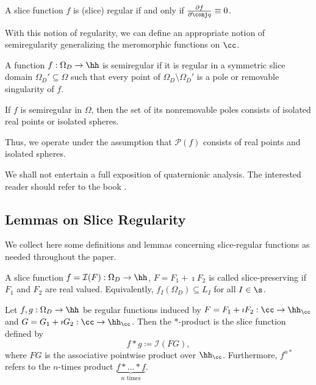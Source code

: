 \documentclass{amsart}
\begin{document}
\begin{remark}
    A slice function $f$ is (slice) regular if and only if $\frac{\partial f}{\partial \conj q}\equiv 0$. 
\end{remark}

With this notion of regularity, we can define an appropriate notion of semiregularity generalizing the meromorphic functions on $\cc$. 

\begin{defin}
    A function $f:\Omega_D\to\hh$ is semiregular if it is regular in a symmetric slice domain $\Omega_D' \subseteq \Omega$ such that every point of $\Omega_D\setminus \Omega_D'$ is a pole or removable singularity of $f$. 
\end{defin}
\begin{remark}
    If $f$ is semiregular in $\Omega$, then the set of its nonremovable poles consists of isolated real points or isolated spheres. 
\end{remark}
Thus, we operate under the assumption that $\mathcal{P}(f)$ consists of real points and isolated spheres. 

We shall not entertain a full exposition of quaternionic analysis. The interested reader should refer to the book \cite{gentili2022}. 

\subsection{Lemmas on Slice Regularity}

We collect here some definitions and lemmas concerning slice-regular functions as needed throughout the paper.

\begin{defin}
    A slice function $f=\mathcal{I}(F):\Omega_D\to\hh$, $F=F_1+\imath F_2$ is called slice-preserving if $F_1$ and $F_2$ are real valued. Equivalently, $f_I(\Omega_D)\subseteq L_I$ for all $I\in\s$.  
\end{defin}

\begin{defin}
    Let $f,g:\Omega_D\to\hh$ be regular functions induced by $F=F_1+\imath F_2:\cc \to\hh_\cc$ and $G=G_1+\imath G_2:\cc \to\hh_\cc$. Then the $*$-product is the slice function defined by \[f*g\coloneq \mathcal{I}(FG),\] where $FG$ is the associative pointwise product over $\hh_\cc$. Furthermore, $f^{n*}$ refers to the $n$-times product $\underbrace{f*\dots*f}_{n\text{ times}}$.
\end{defin}
\end{document}
